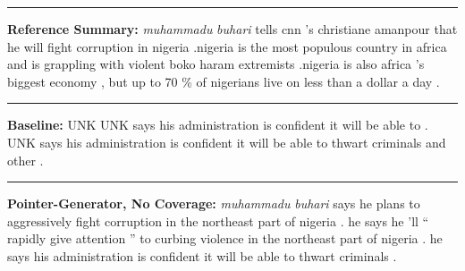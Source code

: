 \documentclass[11pt,a4paper]{article}
\begin{document}
\begin{figure*}
\begin{boxedminipage}{\textwidth}
                                             
\newline \rule{\columnwidth}{0.4pt}
\textbf{Reference Summary:} \newline \textit{muhammadu} \textit{buhari} tells cnn 's christiane amanpour that he will fight corruption in nigeria .\newline nigeria is the most populous country in africa and is grappling with violent boko haram extremists .\newline nigeria is also africa 's biggest economy , but up to 70 \% of nigerians live on less than a dollar a day .
\newline \rule{\columnwidth}{0.4pt}
\textbf{Baseline:} \newline
UNK UNK says his administration is confident it will be able to  . \newline
UNK says his administration is confident it will be able to thwart criminals and other  . \newline
{}
\newline \rule{\columnwidth}{0.4pt}
\textbf{Pointer-Generator, No Coverage:} \newline
\textit{muhammadu} \textit{buhari} says he plans to aggressively fight corruption in the northeast part of nigeria . \newline
he says he 'll `` rapidly give attention '' to curbing violence in the northeast part of nigeria . \newline
he says his administration is confident it will be able to thwart criminals .

\end{boxedminipage}
\end{figure*}
\end{document}

